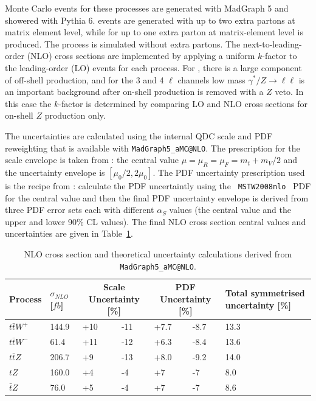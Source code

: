 Monte Carlo events for these processes are generated with MadGraph 5 and showered with Pythia 6.  \ttW events are generated with up to two extra partons at matrix element level, while for \ttZ up to one extra parton at matrix-element level is produced.  The \tZ process is simulated without extra partons.  The next-to-leading-order (NLO) cross sections are implemented by applying a uniform $k$-factor to the leading-order (LO) events for each process.  For \ttZ, there is a large component of off-shell production, and for the 3 and 4 $\ell$ channels low mass $\gamma^*/Z \to \ell\ell$ is an important background after on-shell production is removed with a $Z$ veto.  In this case the $k$-factor is determined by comparing LO and NLO cross sections for on-shell $Z$ production only.   

The \ttV uncertainties are calculated
using the internal QDC scale and PDF reweighting that is available with
{\tt MadGraph5\_aMC@NLO}. The prescription for the scale envelope is taken from
\cite{Garzelli:2012bn}: the central value $\mu=\mu_{R}=\mu_{F}=m_t+m_V/2$
and the uncertainty envelope is $[\mu_{0}/2,2\mu_{0}]$. The PDF
uncertainty prescription used is the recipe from
\cite{Campbell:2012dh}: calculate the PDF uncertaintly using the {\tt
MSTW2008nlo}~\cite{Martin:2009iq} PDF for the central value and then the final PDF
uncertainty envelope is derived from three PDF error sets each with
different $\alpha_S$ values (the central value and the upper and lower
90\% CL values). The final NLO cross section central values and
uncertainties are given in Table~\ref{tab:ttVXSunc}.

\begin{table}%
\begin{center}
\caption{NLO cross section and theoretical uncertainty
  calculations derived from {\tt MadGraph5\_aMC@NLO}.}
\label{tab:ttVXSunc}
\begin{tabular}{l|p{}|p{}|p{}|p{}|p{}|p{}}
\hline
Process & $\sigma_{NLO}$ [$fb$] & \multicolumn{2}{c|}{Scale
Uncertainty [\%]} & \multicolumn{2}{c|}{PDF Uncertainty [\%]} & Total
symmetrised uncertainty [\%] \\
\hline
\hline
$t\bar{t}W^{+}$ & 144.9 & +10 & -11 & +7.7 & -8.7 & 13.3 \\
$t\bar{t}W^{-}$ & 61.4  & +11 & -12 & +6.3 & -8.4 & 13.6 \\
$t\bar{t}Z$     & 206.7 & +9  & -13 & +8.0 & -9.2 & 14.0 \\
$tZ$            & 160.0 & +4  & -4  & +7   & -7   & 8.0 \\
$\bar{t}Z$      & 76.0  & +5  & -4  & +7   & -7   & 8.6 \\
\hline
\end{tabular}
\end{center}
\end{table}

